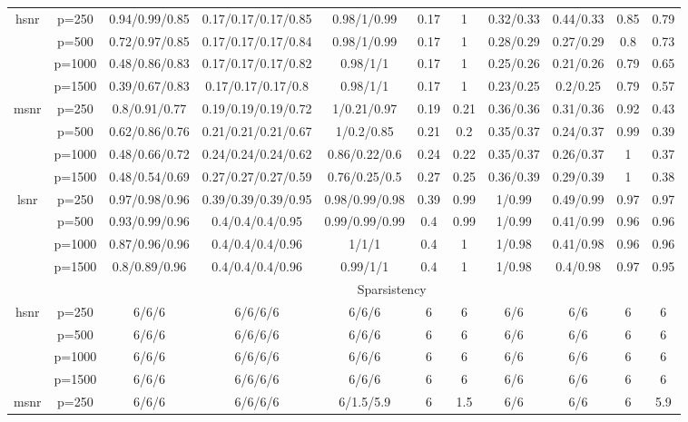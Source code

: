 \begin{table}[ht]
{\begin{tabular}{|c|c|ccccccccc|}
\midrule\multirow{4}[2]{*}{hsnr} & p=250 & 0.94/0.99/0.85 & 0.17/0.17/0.17/0.85 & 0.98/1/0.99 & 0.17 & 1 & 0.32/0.33 & 0.44/0.33 & 0.85 & 0.79 \\ 
   & p=500 & 0.72/0.97/0.85 & 0.17/0.17/0.17/0.84 & 0.98/1/0.99 & 0.17 & 1 & 0.28/0.29 & 0.27/0.29 & 0.8 & 0.73 \\ 
   & p=1000 & 0.48/0.86/0.83 & 0.17/0.17/0.17/0.82 & 0.98/1/1 & 0.17 & 1 & 0.25/0.26 & 0.21/0.26 & 0.79 & 0.65 \\ 
   & p=1500 & 0.39/0.67/0.83 & 0.17/0.17/0.17/0.8 & 0.98/1/1 & 0.17 & 1 & 0.23/0.25 & 0.2/0.25 & 0.79 & 0.57 \\ 
  \midrule\multirow{4}[2]{*}{msnr} & p=250 & 0.8/0.91/0.77 & 0.19/0.19/0.19/0.72 & 1/0.21/0.97 & 0.19 & 0.21 & 0.36/0.36 & 0.31/0.36 & 0.92 & 0.43 \\ 
   & p=500 & 0.62/0.86/0.76 & 0.21/0.21/0.21/0.67 & 1/0.2/0.85 & 0.21 & 0.2 & 0.35/0.37 & 0.24/0.37 & 0.99 & 0.39 \\ 
   & p=1000 & 0.48/0.66/0.72 & 0.24/0.24/0.24/0.62 & 0.86/0.22/0.6 & 0.24 & 0.22 & 0.35/0.37 & 0.26/0.37 & 1 & 0.37 \\ 
   & p=1500 & 0.48/0.54/0.69 & 0.27/0.27/0.27/0.59 & 0.76/0.25/0.5 & 0.27 & 0.25 & 0.36/0.39 & 0.29/0.39 & 1 & 0.38 \\ 
  \midrule\multirow{4}[2]{*}{lsnr} & p=250 & 0.97/0.98/0.96 & 0.39/0.39/0.39/0.95 & 0.98/0.99/0.98 & 0.39 & 0.99 & 1/0.99 & 0.49/0.99 & 0.97 & 0.97 \\ 
   & p=500 & 0.93/0.99/0.96 & 0.4/0.4/0.4/0.95 & 0.99/0.99/0.99 & 0.4 & 0.99 & 1/0.99 & 0.41/0.99 & 0.96 & 0.96 \\ 
   & p=1000 & 0.87/0.96/0.96 & 0.4/0.4/0.4/0.96 & 1/1/1 & 0.4 & 1 & 1/0.98 & 0.41/0.98 & 0.96 & 0.96 \\ 
   & p=1500 & 0.8/0.89/0.96 & 0.4/0.4/0.4/0.96 & 0.99/1/1 & 0.4 & 1 & 1/0.98 & 0.4/0.98 & 0.97 & 0.95 \\ 
   \midrule 
 \multicolumn{1}{|c}{} &       & \multicolumn{9}{c|}{Sparsistency} \\
\midrule\multirow{4}[2]{*}{hsnr} & p=250 & 6/6/6 & 6/6/6/6 & 6/6/6 & 6 & 6 & 6/6 & 6/6 & 6 & 6 \\ 
   & p=500 & 6/6/6 & 6/6/6/6 & 6/6/6 & 6 & 6 & 6/6 & 6/6 & 6 & 6 \\ 
   & p=1000 & 6/6/6 & 6/6/6/6 & 6/6/6 & 6 & 6 & 6/6 & 6/6 & 6 & 6 \\ 
   & p=1500 & 6/6/6 & 6/6/6/6 & 6/6/6 & 6 & 6 & 6/6 & 6/6 & 6 & 6 \\ 
  \midrule\multirow{4}[2]{*}{msnr} & p=250 & 6/6/6 & 6/6/6/6 & 6/1.5/5.9 & 6 & 1.5 & 6/6 & 6/6 & 6 & 5.9 \\ 

\end{tabular}}
\end{table}
